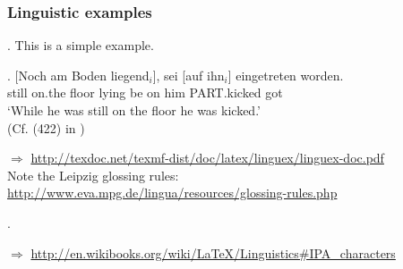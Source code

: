 \begin{frame}[fragile]
\begin{itemize}
\end{itemize} 

\end{frame}

\begin{frame}[fragile]
\frametitle{Linguistic examples}
\ex. This is a simple example.

\exg. [Noch am Boden liegend$_i$], sei [auf ihn$_i$] eingetreten worden.\\
still on.the floor lying be on him PART.kicked got\\
`While he was still on the floor he was kicked.'\\
(Cf. (422) in \cite{Mueller:02})

\noindent $\Rightarrow$ \url{http://texdoc.net/texmf-dist/doc/latex/linguex/linguex-doc.pdf} \\
Note the Leipzig glossing rules: \url{http://www.eva.mpg.de/lingua/resources/glossing-rules.php}

\ex. 

$\Rightarrow$ \url{http://en.wikibooks.org/wiki/LaTeX/Linguistics#IPA_characters}
\end{frame}

